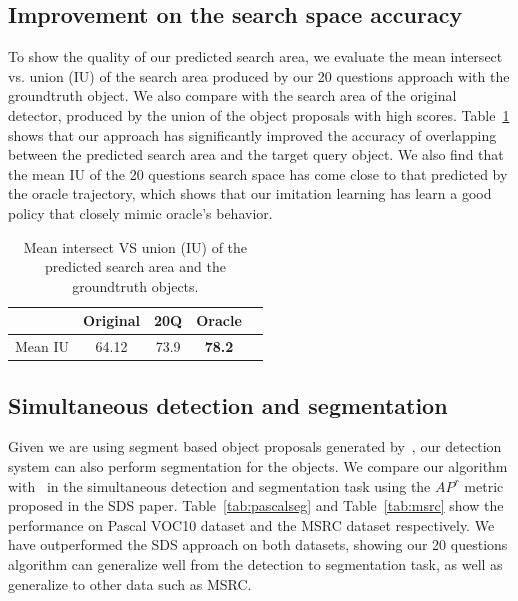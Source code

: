 \subsection{Improvement on the search space accuracy} To show the quality of our predicted search area, we evaluate the mean intersect vs. union (IU) of the search area produced by our 20 questions approach with the groundtruth object. We also compare with the search area of the original detector, produced by the union of the object proposals with high scores. Table~\ref{tab:space} shows that our approach has significantly improved the accuracy of overlapping between the predicted search area and the target query object.  We also find that the mean IU of the 20 questions search space has come close to that predicted by the oracle trajectory, which shows that our imitation learning has learn a good policy that closely mimic oracle's behavior.
\begin{table}\footnotesize                               
\begin{center}
\begin{tabular}{|c|c|c|c|c|}                    
\hline                                          
 & Original & 20Q  & Oracle \\          
\hline                                          
 Mean IU & 64.12 &  73.9 &  \textbf{78.2} \\        
\hline                                          
\end{tabular}     
\end{center}                              
\caption{Mean intersect VS union (IU) of the predicted search area and the groundtruth objects. }                        
\label{tab:space}                      
\end{table}  

\subsection{Simultaneous detection and segmentation}
Given we are using segment based object proposals generated by~\cite{arbelaez2014multiscale}, our detection system can also perform segmentation for the objects. We compare our algorithm with~\cite{BharathECCV2014} in  the simultaneous detection and segmentation task using the $AP^r$ metric proposed in the SDS paper. Table~\ref{tab:pascalseg} and Table~\ref{tab:msrc} show the performance on Pascal VOC10 dataset and the MSRC dataset respectively. We have outperformed the SDS approach on both datasets, showing our 20 questions algorithm can generalize well from the detection to segmentation task, as well as generalize to other data such as MSRC.





